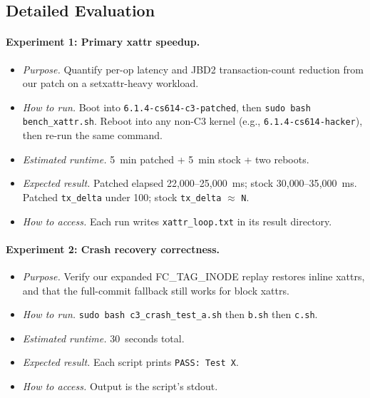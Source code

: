 \documentclass[11pt,a4paper]{article}
\begin{document}
\subsection{Detailed Evaluation}

\paragraph{Experiment 1: Primary xattr speedup.}
\begin{itemize}[leftmargin=*]
  \item \textit{Purpose.} Quantify per-op latency and JBD2
        transaction-count reduction from our patch on a
        setxattr-heavy workload.
  \item \textit{How to run.} Boot into
        \texttt{6.1.4-cs614-c3-patched}, then
        \texttt{sudo bash bench\_xattr.sh}. Reboot into any
        non-C3 kernel (e.g., \texttt{6.1.4-cs614-hacker}), then
        re-run the same command.
  \item \textit{Estimated runtime.} 5~min patched + 5~min stock +
        two reboots.
  \item \textit{Expected result.} Patched elapsed
        22{,}000--25{,}000~ms; stock 30{,}000--35{,}000~ms.
        Patched \texttt{tx\_delta} under 100; stock
        \texttt{tx\_delta} $\approx$ \texttt{N}.
  \item \textit{How to access.} Each run writes
        \texttt{xattr\_loop.txt} in its result directory.
\end{itemize}

\paragraph{Experiment 2: Crash recovery correctness.}
\begin{itemize}[leftmargin=*]
  \item \textit{Purpose.} Verify our expanded FC\_TAG\_INODE replay
        restores inline xattrs, and that the full-commit fallback
        still works for block xattrs.
  \item \textit{How to run.} \texttt{sudo bash c3\_crash\_test\_a.sh}
        then \texttt{b.sh} then \texttt{c.sh}.
  \item \textit{Estimated runtime.} 30~seconds total.
  \item \textit{Expected result.} Each script prints
        \texttt{PASS: Test X}.
  \item \textit{How to access.} Output is the script's stdout.
\end{itemize}
\end{document}
